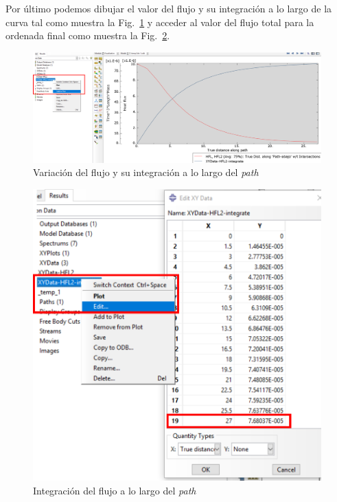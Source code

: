 \begin{itemize}
Por último podemos dibujar el valor del flujo y su integración a lo largo de la curva tal como muestra la Fig.~\ref{post26e} y acceder al valor del flujo total para la ordenada final como muestra la Fig.~\ref{post26f}.
     \begin{figure}[!h]
    \begin{center}
      \includegraphics[width=0.99\textwidth]{./body/images/post26e.pdf}
    \end{center}
    \caption{Variación del flujo y su integración a lo largo del \textit{path}}
    \label{post26e}
  \end{figure}
      \begin{figure}[!h]
    \begin{center}
      \includegraphics[width=0.99\textwidth]{./body/images/post26f.pdf}
    \end{center}
    \caption{Integración del flujo a lo largo del \textit{path}}
    \label{post26f}
  \end{figure}
  

\end{itemize}
